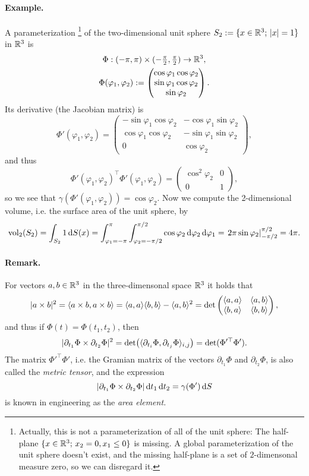 \paragraph{Example.} A parameterization%
\footnote{Actually, this is not a parameterization of all of the unit sphere:
The half-plane $\{x\in\mathbb{R}^{3};\, x_{2}=0,x_{1}\le0\}$ is missing.
A global parameterization of the unit sphere doesn't exist, and the
missing half-plane is a set of $2$-dimensonal measure zero, so we
can disregard it.%
} of the two-dimensional unit sphere $S_{2}:=\{x\in\mathbb{R}^{3};\,\lvert x\rvert=1\}$
in $\mathbb{R}^{3}$ is\begin{gather*}
\Phi:(-\pi,\pi)\times(-\tfrac{\pi}{2},\tfrac{\pi}{2})\to\mathbb{R}^{3},\\
\Phi(\varphi_{1},\varphi_{2}):=\begin{pmatrix}\cos\varphi_{1}\cos\varphi_{2}\\
\sin\varphi_{1}\cos\varphi_{2}\\
\sin\varphi_{2}\end{pmatrix}.\end{gather*}
Its derivative (the Jacobian matrix) is\[
\Phi'(\varphi_{1},\varphi_{2})=\begin{pmatrix}-\sin\varphi_{1}\cos\varphi_{2} & -\cos\varphi_{1}\sin\varphi_{2}\\
\cos\varphi_{1}\cos\varphi_{2} & -\sin\varphi_{1}\sin\varphi_{2}\\
0 & \cos\varphi_{2}\end{pmatrix},\]
and thus\[
\Phi'(\varphi_{1},\varphi_{2})^{\top}\Phi'(\varphi_{1},\varphi_{2})=\begin{pmatrix}\cos^{2}\varphi_{2} & 0\\
0 & 1\end{pmatrix},\]
so we see that $\gamma(\Phi'(\varphi_{1},\varphi_{2}))=\cos\varphi_{2}$.
Now we compute the 2-dimensional volume, i.e. the surface area of
the unit sphere, by\[
\operatorname{vol}_{2}(S_{2})=\int_{S_{2}}1\,\mathrm{d} S(x)=\int_{\varphi_{1}=-\pi}^{\pi}\int_{\varphi_{2}=-\pi/2}^{\pi/2}\cos\varphi_{2}\,\mathrm{d}\varphi_{2}\,\mathrm{d}\varphi_{1}=\left.2\pi\sin\varphi_{2}\right|_{-\pi/2}^{\pi/2}=4\pi.\]

\paragraph{Remark.}

For vectors $a,b\in\mathbb{R}^{3}$ in the three-dimensonal space $\mathbb{R}^{3}$
it holds that\[
\lvert a\times b\rvert^{2}=\langle a\times b,a\times b\rangle=\langle a,a\rangle\langle b,b\rangle-\langle a,b\rangle^{2}=\det\begin{pmatrix}\langle a,a\rangle & \langle a,b\rangle\\
\langle b,a\rangle & \langle b,b\rangle\end{pmatrix},\]
and thus if $\Phi(t)=\Phi(t_{1},t_{2})$, then\[
\lvert\partial_{t_{1}}\Phi\times\partial_{t_{2}}\Phi\rvert^{2}=\det\bigl(\langle\partial_{t_{i}}\Phi,\partial_{t_{j}}\Phi\rangle_{i,j}\bigr)=\det(\Phi'^{\top}\Phi').\]
The matrix $\Phi'^{\top}\Phi'$, i.e. the Gramian matrix of the vectors
$\partial_{t_{1}}\Phi$ and $\partial_{t_{2}}\Phi$, is also called the \textit{metric
tensor}, and the expression \[
\lvert\partial_{t_{1}}\Phi\times\partial_{t_{2}}\Phi\rvert\,\mathrm{d} t_{1}\,\mathrm{d} t_{2}=\gamma(\Phi')\,\mathrm{d} S\]
 is known in engineering as the \textit{area element.}
